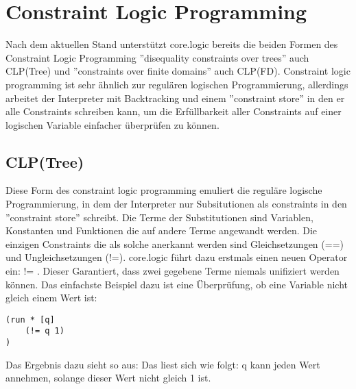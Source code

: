 \section{Constraint Logic Programming}
Nach dem aktuellen Stand unterstützt core.logic bereits die beiden Formen des Constraint Logic Programming ''disequality constraints over trees'' auch CLP(Tree) und ''constraints over finite domains'' auch CLP(FD).
Constraint logic programming ist sehr ähnlich zur regulären logischen Programmierung, allerdings arbeitet der Interpreter mit Backtracking und einem ''constraint store'' in den er alle Constraints schreiben kann, um die Erfüllbarkeit aller Constraints auf einer logischen Variable einfacher überprüfen zu können.

\subsection{CLP(Tree)}
Diese Form des constraint logic programming emuliert die reguläre logische Programmierung, in dem der Interpreter nur Subsitutionen als constraints in den ''constraint store'' schreibt. 
Die Terme der Substitutionen sind Variablen, Konstanten und Funktionen die auf andere Terme angewandt werden. 
Die einzigen Constraints die als solche anerkannt werden sind Gleichsetzungen (==) und Ungleichsetzungen (!=).
core.logic führt dazu erstmals einen neuen Operator ein: != . Dieser Garantiert, dass zwei gegebene Terme niemals unifiziert werden können.
Das einfachste Beispiel dazu ist eine Überprüfung, ob eine Variable nicht gleich einem Wert ist:
\begin{lstlisting}
(run * [q]
	(!= q 1)
)
\end{lstlisting}
Das Ergebnis dazu sieht so aus:  Das liest sich wie folgt: q kann jeden Wert annehmen, solange dieser Wert nicht gleich 1 ist.

